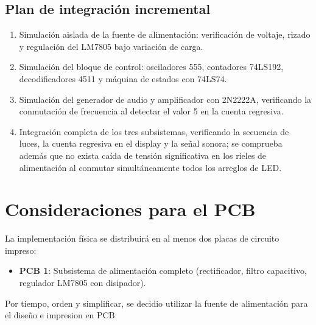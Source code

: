\documentclass[10pt,onecolumn]{IEEEtran}
\begin{document}
\subsection{Plan de integración incremental}

\begin{enumerate}
    \item Simulación aislada de la fuente de alimentación: verificación de voltaje, rizado y regulación del LM7805 bajo variación de carga.
    \item Simulación del bloque de control: osciladores 555, contadores 74LS192, decodificadores 4511 y máquina de estados con 74LS74.
    \item Simulación del generador de audio y amplificador con 2N2222A, verificando la conmutación de frecuencia al detectar el valor 5 en la cuenta regresiva.
    \item Integración completa de los tres subsistemas, verificando la secuencia de luces, la cuenta regresiva en el display y la señal sonora; se comprueba además que no exista caída de tensión significativa en los rieles de alimentación al conmutar simultáneamente todos los arreglos de LED.
\end{enumerate}



\section{Consideraciones para el PCB}

La implementación física se distribuirá en al menos dos placas de circuito impreso:

\begin{itemize}
    \item \textbf{PCB 1}: Subsistema de alimentación completo (rectificador, filtro capacitivo, regulador LM7805 con disipador).
\end{itemize}
 Por tiempo, orden y simplificar, se decidio utilizar la fuente de alimentación para el diseño e impresion en PCB

\end{document}
